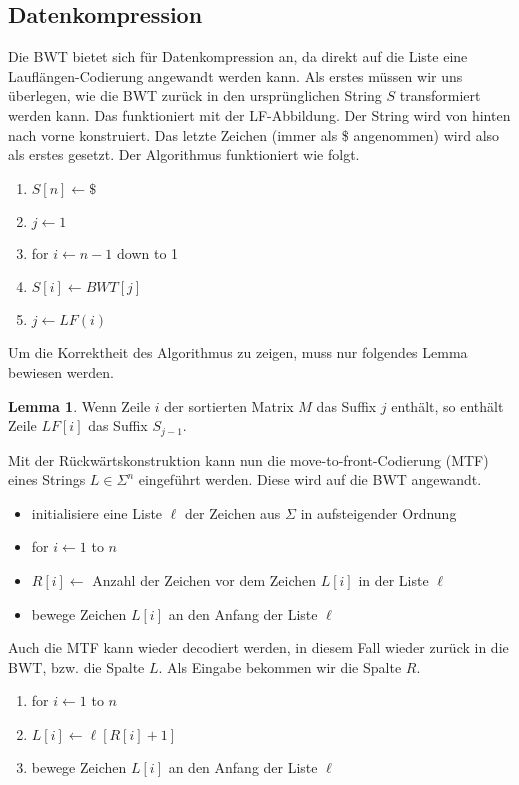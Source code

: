 \documentclass[a4paper, 12pt]{article}
\theoremstyle{plain}
\theoremstyle{definition}
\theoremstyle{lemma}
\newtheorem{lemma}[theorem]{Lemma}
\theoremstyle{remark}
\theoremstyle{corollary}
\theoremstyle{example}
\begin{document}
	\subsection{Datenkompression}
	Die BWT bietet sich für Datenkompression an, da direkt auf die Liste eine Lauflängen-Codierung angewandt werden kann.
	Als erstes müssen wir uns überlegen, wie die BWT zurück in den ursprünglichen String $S$ transformiert werden kann. Das funktioniert mit der LF-Abbildung. Der String wird von hinten nach vorne konstruiert. Das letzte Zeichen (immer als \$ angenommen) wird also als erstes gesetzt. Der Algorithmus funktioniert wie folgt. \begin{enumerate}
		\item $S[n] \gets \$$
		\item $j \gets 1$
		\item for $i\gets n-1$ down to 1
		\item $S[i]\gets BWT[j]$
		\item $j \gets LF(i)$
	\end{enumerate} 
	Um die Korrektheit des Algorithmus zu zeigen, muss nur folgendes Lemma bewiesen werden.
	\begin{lemma}
		Wenn Zeile $i$ der sortierten Matrix $M$ das Suffix $j$ enthält, so enthält Zeile $LF[i]$ das Suffix $S_{j-1}$.
	\end{lemma}
	\noindent Mit der Rückwärtskonstruktion kann nun die move-to-front-Codierung (MTF) eines Strings $L\in \Sigma^n$ eingeführt werden. Diese wird auf die BWT angewandt.
	\begin{itemize}
		\item initialisiere eine Liste $\ell$ der Zeichen aus $\Sigma$ in aufsteigender Ordnung
		\item for $i\gets 1$ to $n$
		\item $R[i] \gets$ Anzahl der Zeichen vor dem Zeichen $L[i]$ in der Liste $\ell$
		\item bewege Zeichen $L[i]$ an den Anfang der Liste $\ell$
	\end{itemize}
	Auch die MTF kann wieder decodiert werden, in diesem Fall wieder zurück in die BWT, bzw. die Spalte $L$. Als Eingabe bekommen wir die Spalte $R$. \begin{enumerate}
		\item for $i \gets 1$ to $n$
		\item $L[i] \gets \ell[R[i]+1]$
		\item bewege Zeichen $L[i]$ an den Anfang der Liste $\ell$
	\end{enumerate}
\end{document}

